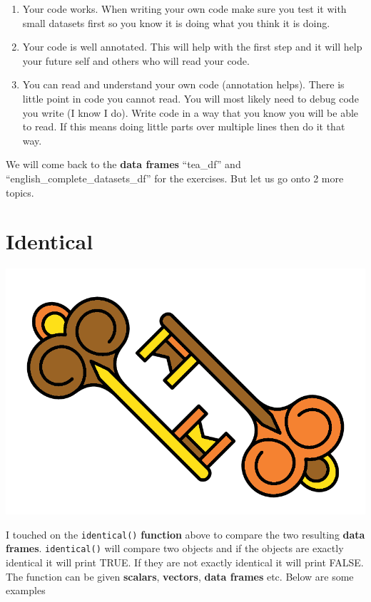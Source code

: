 \documentclass[]{book}
\providecommand{\tightlist}{%
  \setlength{\itemsep}{0pt}\setlength{\parskip}{0pt}}
\begin{document}
\begin{enumerate}
\def\labelenumi{\arabic{enumi}.}
\tightlist
\item
  Your code works. When writing your own code make sure you test it with
  small datasets first so you know it is doing what you think it is
  doing.
\item
  Your code is well annotated. This will help with the first step and it
  will help your future self and others who will read your code.
\item
  You can read and understand your own code (annotation helps). There is
  little point in code you cannot read. You will most likely need to
  debug code you write (I know I do). Write code in a way that you know
  you will be able to read. If this means doing little parts over
  multiple lines then do it that way.
\end{enumerate}

We will come back to the \textbf{data frames} ``tea\_df'' and
``english\_complete\_datasets\_df'' for the exercises. But let us go
onto 2 more topics.

\section{Identical}\label{identical}

\begin{center}\includegraphics[width=0.2\linewidth]{figures/identikeys} \end{center}

I touched on the \texttt{identical()} \textbf{function} above to compare
the two resulting \textbf{data frames}. \texttt{identical()} will
compare two objects and if the objects are exactly identical it will
print TRUE. If they are not exactly identical it will print FALSE. The
function can be given \textbf{scalars}, \textbf{vectors}, \textbf{data
frames} etc. Below are some examples
\end{document}

